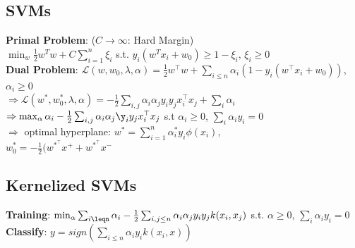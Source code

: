 \subsection*{SVMs}
\textbf{Primal Problem}: 
    {\scriptsize ($C \rightarrow \infty$: Hard Margin)}\\
    {\footnotesize $\min_w \frac{1}{2} w^Tw + C \sum_{i=1}^n \xi_i$ s.t. $y_i(w^T x_i +w_0) \geq 1-\xi_i, \, \xi_i \geq 0$ }\\
\textbf{Dual Problem}:
    $\mathcal{L}(w, w_0, \lambda, \alpha) = \frac{1}{2} w^\top w + \sum_{i \leq n} \alpha_i (1 - y_i(w^\top x_i + w_0))$, $\alpha_i \geq 0$ \\
    {\footnotesize $\Rightarrow \mathcal{L}(w^*, w_0^*, \lambda, \alpha) = - \frac{1}{2} \sum_{i,j} \alpha_i \alpha_j y_i y_j x_i^\top x_j + \sum_i \alpha_i$} \\
    $\Rightarrow \max_\alpha \alpha_i - \frac{1}{2} \sum_{i,j} \alpha_i \alpha_j \y_i y_j x_i^\top x_j$ s.t $\alpha_i \geq 0$, $\sum_i \alpha_i y_i = 0$ \\
    $\Rightarrow$ optimal hyperplane:  $w^* = \sum_{i=1}^n \alpha_i^* y_i \phi(x_i)$, \\
    $w_0^* = -\frac{1}{2} (w^*^\top x^+ + w^*^\top x^-$ 

\subsection*{Kernelized SVMs}
\textbf{Training}: $\min_{\alpha} \sum_{i\leqn} \alpha_i - \frac{1}{2} \sum_{i,j \leq n} \alpha_i \alpha_j y_i y_j k(x_i, x_j)$ s.t. $\alpha \geq 0$, $\sum_i \alpha_i y_i = 0$ \\
\textbf{Classify}: $y = sign(\sum_{i \leq n} \alpha_i y_i k(x_i, x))$

